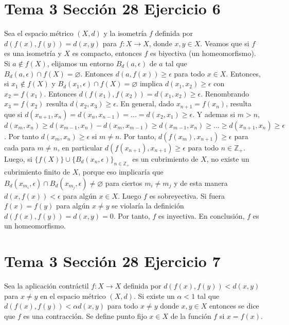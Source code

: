 \documentclass{article}
\begin{document}
\section{Tema 3 Sección 28 Ejercicio 6}
Sea el espacio métrico $(X,d)$ y la isometría $f$ definida por $d(f(x),f(y))=d(x,y)$ para $f:X\rightarrow X$, donde $x,y\in X$. Veamos que si $f$ es una isometría y $X$ es compacto, entonces $f$ es biyectiva (un homeomorfismo). Si $a\notin f(X)$, elijamos un entorno $B_d(a,\epsilon)$ de $a$ tal que $B_d(a,\epsilon)\cap f(X)=\varnothing$. Entonces $d(a,f(x))\geq \epsilon$ para todo $x\in X$. Entonces, si $x_1\notin f(X)$ y $B_d(x_1,\epsilon)\cap f(X)=\varnothing$ implica $d(x_1,x_2)\geq \epsilon$ con $x_2=f(x_1)$. Entonces $d(f(x_1),f(x_2))= d(x_1,x_2)\geq \epsilon$. Renombrando $x_3=f(x_2)$ resulta $d(x_2,x_3)\geq \epsilon$. En general, dado $x_{n+1} = f(x_n)$, resulta que si $d(x_{n+1},x_n)=d(x_{n},x_{n-1})=...=d(x_2,x_1)\geq \epsilon$. Y ademas si $m> n$, $d(x_m,x_n)\geq d(x_{m-1},x_n)-d(x_{m},x_{m-1})\geq d(x_{m-1},x_n)\geq ...\geq d(x_{n+1},x_n)\geq \epsilon$. Por tanto $d(x_m,x_n)\geq \epsilon$ si $m\neq n$. Por tanto, $d(f(x_m),x_{n+1})\geq \epsilon$ para cada para $m\neq n$, en particular $d(f(x_{n+1}),x_{n+1})\geq \epsilon$ para todo $n\in \mathbb{Z}_+$. Luego, si
 $\{f(X)\}\cup\{B_d(x_n,\epsilon)\}_{n\in \mathbb{Z}_+}$ es un cubrimiento de $X$, no existe un cubrimiento finito de $X$, porque eso implicaría que $B_d(x_{m_i},\epsilon)\cap B_d(x_{m_j},\epsilon)\neq \varnothing$ para ciertos $m_i\neq m_j$ y de esta manera $d(x,f(x))<\epsilon$ para algún $x\in X$. Luego $f$ es sobreyectiva. Si fuera $f(x)= f(y)$ para algún $x\neq y$ se violaría la definición $d(f(x),f(y))=d(x,y)=0$. Por tanto, $f$ es inyectiva. En conclusión, $f$ es un homeomorfismo.
\section{Tema 3 Sección 28 Ejercicio 7}
Sea la aplicación contráctil $f:X\rightarrow X$ definida por $d(f(x),f(y))<d(x,y)$ para $x\neq y$ en el espacio métrico $(X,d)$. Si existe un $\alpha<1$ tal que $d(f(x),f(y))<\alpha d(x,y)$ para todo $x\neq y$ donde $x,y\in X$ entonces se dice que $f$ es una contracción. Se define punto fijo $x\in X$ de la función $f$ si $x=f(x)$.
\end{document}
